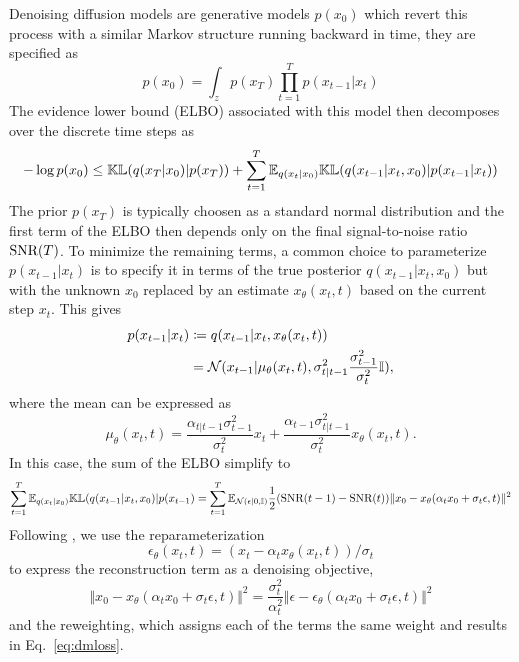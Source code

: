 \documentclass[10pt,twocolumn,letterpaper]{article}
\begin{document}
Denoising diffusion models are generative models $p(x_0)$ which revert this
process with a similar Markov structure running backward in time, \ie they are
specified as
\begin{equation}
  p(x_0) = \int_{z} p(x_T) \prod_{t=1}^T p(x_{t-1} \vert x_t)
\end{equation}
The evidence lower bound (ELBO) associated with this model then decomposes over
the discrete time steps as
\begin{equation}
  -\log p(x_0) \le \mathbb{KL}(q(x_T \vert x_0) \vert p(x_T)) + \sum_{t=1}^T
  \mathbb{E}_{q(x_t \vert x_0)} \mathbb{KL}(q(x_{t-1} \vert x_t, x_0) \vert p(x_{t-1}
  \vert x_t))
\end{equation}
The prior $p(x_T)$ is typically choosen as a standard normal distribution and
the first term of the ELBO then depends only on the final signal-to-noise ratio
$\text{SNR}(T)$. To minimize the remaining terms, a common choice to parameterize
$p(x_{t-1} \vert x_t)$ is to specify it in terms of the true posterior
$q(x_{t-1} \vert x_t, x_0)$ but with the unknown $x_0$ replaced by an estimate
$x_\theta(x_t, t)$ based on the current step $x_t$. This gives \cite{DBLP:journals/corr/abs-2107-00630}
\begin{align}
  p(x_{t-1} \vert x_t) &\coloneqq q(x_{t-1} \vert x_t, x_\theta(x_t, t)) \\
  &= \mathcal{N}(x_{t-1} \vert \mu_\theta(x_t, t), \sigma_{t\vert t-1}^2
  \frac{\sigma_{t-1}^2}{\sigma_t^2}\mathbb{I}),
\end{align}
where the mean can be expressed as
\begin{equation}
  \mu_\theta(x_t, t) = \frac{\alpha_{t\vert t-1} \sigma_{t-1}^2}{\sigma_t^2}
  x_t + \frac{\alpha_{t-1} \sigma_{t\vert t-1}^2}{\sigma_t^2} x_\theta(x_t, t).
\end{equation}
In this case, the sum of the ELBO simplify to
\begin{equation}
  \sum_{t=1}^T \mathbb{E}_{q(x_t \vert x_0)} \mathbb{KL}(q(x_{t-1} \vert x_t, x_0) \vert p(x_{t-1}) =
  \sum_{t=1}^T \mathbb{E}_{\mathcal{N}(\epsilon \vert 0, \mathbb{I})} \frac{1}{2}(\text{SNR}(t-1) -
  \text{SNR}(t)) \Vert x_0 - x_\theta(\alpha_t x_0 + \sigma_t \epsilon, t) \Vert^2
\end{equation}
Following \cite{DBLP:conf/nips/HoJA20}, we use the reparameterization
\begin{equation}
  \epsilon_\theta(x_t, t) = (x_t - \alpha_t x_\theta(x_t, t))/\sigma_t
\end{equation}
to express the reconstruction term as a denoising objective,
\begin{equation}
  \Vert x_0 - x_\theta(\alpha_t x_0 + \sigma_t \epsilon, t) \Vert^2 =
  \frac{\sigma_t^2}{\alpha_t^2} \Vert \epsilon - \epsilon_\theta(\alpha_t x_0 +
  \sigma_t \epsilon, t) \Vert^2
\end{equation}
and the reweighting, which assigns each of the terms the same weight and
results in Eq.~\eqref{eq:dmloss}.
\end{document}
